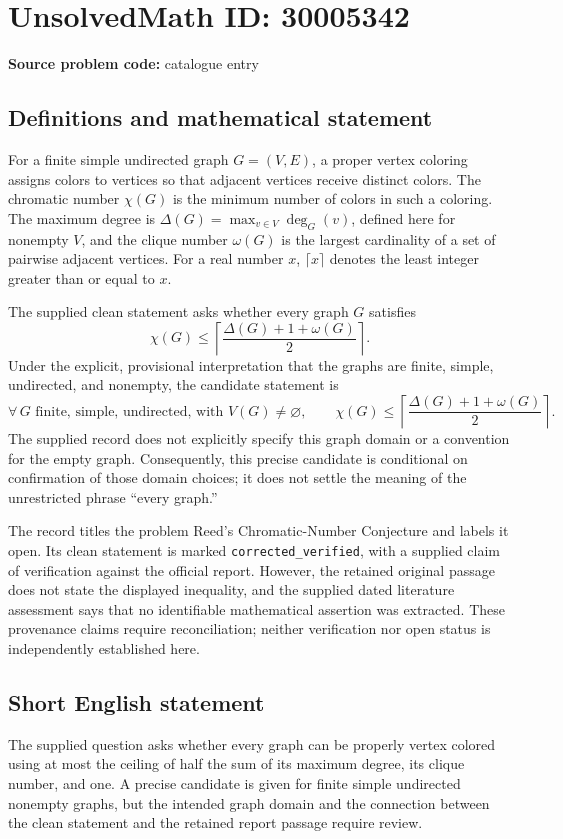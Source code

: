 \documentclass[11pt]{article}
\begin{document}
\section*{UnsolvedMath ID: 30005342}
\textbf{Source problem code:} catalogue entry
\subsection{Definitions and mathematical statement}
For a finite simple undirected graph \(G=(V,E)\), a proper vertex coloring assigns colors to vertices so that adjacent vertices receive distinct colors. The chromatic number \(\chi(G)\) is the minimum number of colors in such a coloring. The maximum degree is \(\Delta(G)=\max_{v\in V}\deg_G(v)\), defined here for nonempty \(V\), and the clique number \(\omega(G)\) is the largest cardinality of a set of pairwise adjacent vertices. For a real number \(x\), \(\lceil x\rceil\) denotes the least integer greater than or equal to \(x\).

The supplied clean statement asks whether every graph \(G\) satisfies
\[
\chi(G)\leq \left\lceil\frac{\Delta(G)+1+\omega(G)}{2}\right\rceil.
\]
Under the explicit, provisional interpretation that the graphs are finite, simple, undirected, and nonempty, the candidate statement is
\[
\forall\,G\text{ finite, simple, undirected, with }V(G)\ne\varnothing,\qquad
\chi(G)\leq \left\lceil\frac{\Delta(G)+1+\omega(G)}{2}\right\rceil.
\]
The supplied record does not explicitly specify this graph domain or a convention for the empty graph. Consequently, this precise candidate is conditional on confirmation of those domain choices; it does not settle the meaning of the unrestricted phrase ``every graph.''

The record titles the problem Reed's Chromatic-Number Conjecture and labels it open. Its clean statement is marked \texttt{corrected\_verified}, with a supplied claim of verification against the official report. However, the retained original passage does not state the displayed inequality, and the supplied dated literature assessment says that no identifiable mathematical assertion was extracted. These provenance claims require reconciliation; neither verification nor open status is independently established here.
\subsection{Short English statement}
The supplied question asks whether every graph can be properly vertex colored using at most the ceiling of half the sum of its maximum degree, its clique number, and one. A precise candidate is given for finite simple undirected nonempty graphs, but the intended graph domain and the connection between the clean statement and the retained report passage require review.
\end{document}
